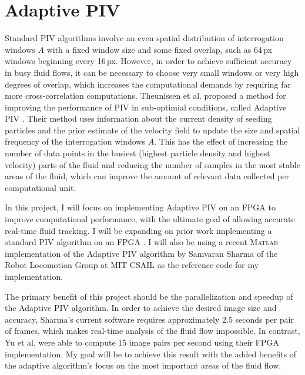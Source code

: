 \documentclass{article}
\begin{document}
	\section{Adaptive PIV} %
	\label{sec:adaptive_piv}
	Standard PIV algorithms involve an even spatial distribution of interrogation windows $A$ with a fixed window size and some fixed overlap, such as 64\,px windows beginning every 16\,px. However, in order to achieve sufficient accuracy in busy fluid flows, it can be necessary to choose very small windows or very high degrees of overlap, which increases the computational demands by requiring far more cross-correlation computations. 	Theunissen et al. proposed a method for improving the performance of PIV in sub-optimial conditions, called Adaptive PIV \citep{Theunissen:2009cr}. Their method uses information about the current density of seeding particles and the prior estimate of the velocity field to update the size and spatial frequency of the interrogation windows $A$. This has the effect of increasing the number of data points in the busiest (highest particle density and highest velocity) parts of the fluid and reducing the number of samples in the most stable areas of the fluid, which can improve the amount of relevant data collected per computational unit. 

	In this project, I will focus on implementing Adaptive PIV on an FPGA to improve computational performance, with the ultimate goal of allowing accurate real-time fluid tracking. I will be expanding on prior work implementing a standard PIV algorithm on an FPGA \citep{Yu:2006tb}. I will also be using a recent \textsc{Matlab} implementation of the Adaptive PIV algorithm by Samvaran Sharma of the Robot Locomotion Group at MIT CSAIL as the reference code for my implementation. 

	The primary benefit of this project should be the parallelization and speedup of the Adaptive PIV algorithm. In order to achieve the desired image size and accuracy, Sharma's current software requires approximately 2.5 seconds per pair of frames, which makes real-time analysis of the fluid flow impossible. In contrast, Yu et al. were able to compute 15 image pairs per second using their FPGA implementation. My goal will be to achieve this result with the added benefits of the adaptive algorithm's focus on the most important areas of the fluid flow.
\end{document}
